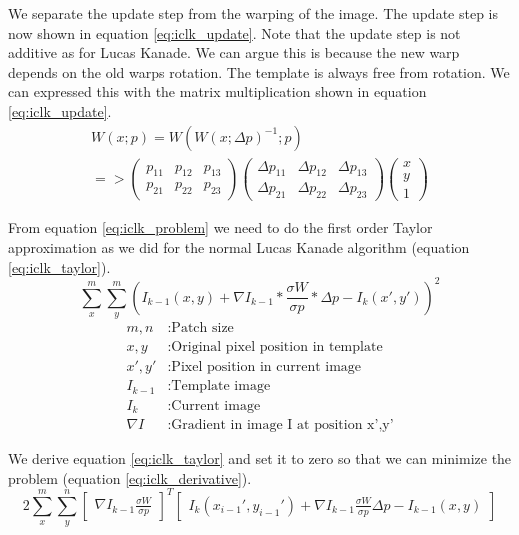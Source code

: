 \documentclass[11pt,a4paper,titlepage,oneside]{report}
\begin{document}
We separate the update step from the warping of the image. The update step is now shown in equation \ref{eq:iclk_update}. Note that the update step is not additive as for Lucas Kanade. We can argue this is because the new warp depends on the old warps rotation. The template is always free from rotation. We can expressed this with the matrix multiplication shown in equation \ref{eq:iclk_update}.
\begin{equation}\label{eq:iclk_update}
  \begin{gathered}
    W(x;p)=W(W(x;\Delta p)^{-1}; p)\\
    =>
    \begin{pmatrix}
    p_{11} & p_{12} & p_{13} \\
    p_{21} & p_{22} & p_{23}
    \end{pmatrix}
    \begin{pmatrix}
      \Delta p_{11} & \Delta p_{12} & \Delta p_{13} \\
      \Delta p_{21} & \Delta p_{22} & \Delta p_{23}
    \end{pmatrix}
    \begin{pmatrix}
      x\\
      y\\
      1
    \end{pmatrix}
  \end{gathered}
\end{equation}

From equation \ref{eq:iclk_problem} we need to do the first order Taylor approximation as we did for the normal Lucas Kanade algorithm (equation \ref{eq:iclk_taylor}).
\begin{equation}\label{eq:iclk_taylor}
  \sum_x^m\sum_y^m(I_{k-1}(x,y)+\nabla I_{k-1}*\frac{\sigma W}{\sigma p}*\Delta p-I_{k}(x',y'))^2
\end{equation}
\begin{align*}
	m,n				 &: \text{Patch size}\\
  x,y        &: \text{Original pixel position in template}\\
  x',y'      &: \text{Pixel position in current image}\\
  I_{k-1}    &: \text{Template image}\\
  I_{k}      &: \text{Current image}\\
  \nabla I  &:  \text{Gradient in image I at position x',y'}
\end{align*}

We derive equation \ref{eq:iclk_taylor} and set it to zero so that we can minimize the problem (equation \ref{eq:iclk_derivative}).
\begin{equation}\label{eq:iclk_derivative}
  2\sum_x^m\sum_y^n\begin{bmatrix}\nabla I_{k-1}\frac{\sigma W}{\sigma p}\end{bmatrix}^T\begin{bmatrix}I_{k}(x_{i-1}',y_{i-1}')+\nabla I_{k-1}\frac{\sigma W}{\sigma p}\Delta p-I_{k-1}(x,y)\end{bmatrix}
\end{equation}
\end{document}
